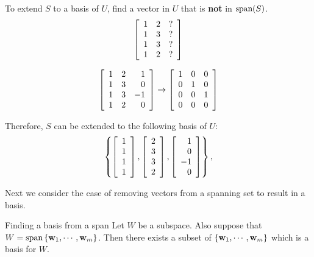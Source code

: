 \begin{solution}
To extend $S$ to a basis of $U$, find a vector in $U$ that is {\bf not} in
$\mbox{span}(S)$.
\[
\left[\begin{array}{rrr}
1 & 2 & ? \\
1 & 3 & ? \\
1 & 3 & ? \\
1 & 2 & ? 
\end{array}\right]
\]

\[
\left[\begin{array}{rrr}
1 & 2 & 1 \\
1 & 3 & 0 \\
1 & 3 & -1 \\
1 & 2 & 0 
\end{array}\right]
\rightarrow
\left[\begin{array}{rrr}
1 & 0 & 0 \\
0 & 1 & 0 \\
0 & 0 & 1 \\
0 & 0 & 0 
\end{array}\right]
\]

Therefore, $S$ can be extended to the following basis of $U$:
\[\left\{ 
\left[\begin{array}{r} 1\\ 1\\ 1\\ 1\end{array}\right],
\left[\begin{array}{r} 2\\ 3\\ 3\\ 2\end{array}\right],
\left[\begin{array}{r} 1\\ 0\\ -1\\ 0\end{array}\right]
\right\},\]
\end{solution}

Next we consider the case of removing vectors from a spanning set to result in a basis. 

\begin{theorem}{Finding a basis from a span}{}
Let $W$ be a subspace. Also suppose that $W=\mbox{span}\left\{ {\bf w}
_{1},\cdots ,{\bf w}_{m}\right\} $. Then there exists a subset of $\left\{ 
{\bf w}_{1},\cdots ,{\bf w}_{m}\right\} $ which is a basis for $W$.
\end{theorem}

